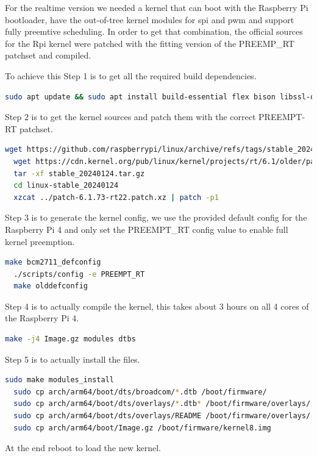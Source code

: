 For the realtime version we needed a kernel that can boot with the Raspberry Pi bootloader,
have the out-of-tree kernel modules for spi and pwm and support fully preemtive scheduling.
In order to get that combination, the official sources for the Rpi kernel were patched with the fitting version of the PREEMP\_RT patchset and compiled.

To achieve this Step 1 is to get all the required build dependencies.
\begin{lstlisting}[language=bash, breaklines]
  sudo apt update && sudo apt install build-essential flex bison libssl-dev bc
\end{lstlisting}

Step 2 is to get the kernel sources and patch them with the correct PREEMPT-RT patchset.
\begin{lstlisting}[language=bash, breaklines]
  wget https://github.com/raspberrypi/linux/archive/refs/tags/stable_20240124.tar.gz
  wget https://cdn.kernel.org/pub/linux/kernel/projects/rt/6.1/older/patch-6.1.73-rt22.patch.xz
  tar -xf stable_20240124.tar.gz
  cd linux-stable_20240124
  xzcat ../patch-6.1.73-rt22.patch.xz | patch -p1
\end{lstlisting}

Step 3 is to generate the kernel config, we use the provided default config for the Raspberry Pi 4 and only set the PREEMPT\_RT config value to enable full kernel preemption.
\begin{lstlisting}[language=bash, breaklines]
  make bcm2711_defconfig
  ./scripts/config -e PREEMPT_RT
  make olddefconfig
\end{lstlisting}

Step 4 is to actually compile the kernel, this takes about 3 hours on all 4 cores of the Raspberry Pi 4.
\begin{lstlisting}[language=bash, breaklines]
  make -j4 Image.gz modules dtbs
\end{lstlisting}

Step 5 is to actually install the files.
\begin{lstlisting}[language=bash, breaklines]
  sudo make modules_install
  sudo cp arch/arm64/boot/dts/broadcom/*.dtb /boot/firmware/
  sudo cp arch/arm64/boot/dts/overlays/*.dtb* /boot/firmware/overlays/
  sudo cp arch/arm64/boot/dts/overlays/README /boot/firmware/overlays/
  sudo cp arch/arm64/boot/Image.gz /boot/firmware/kernel8.img
\end{lstlisting}

At the end reboot to load the new kernel.

